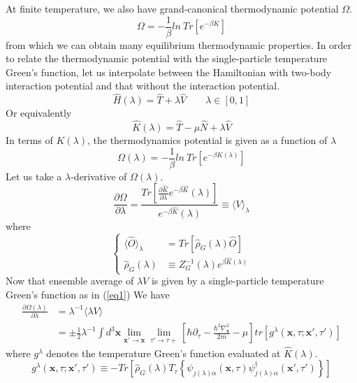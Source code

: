 At finite temperature, we also have grand-canonical thermodynamic potential $\Omega$.
\begin{equation}
\Omega=-\frac{1}{\beta}ln\ Tr\left[e^{-\beta K}\right]
\end{equation}
from which we can obtain many equilibrium thermodynamic properties.
In order to relate the thermodynamic potential with the single-particle temperature Green's function, let us interpolate between the Hamiltonian with two-body interaction potential and that without the interaction potential.
$$\hat{H}(\lambda)=\hat{T}+\lambda \hat{V}\qquad \lambda\in[0,1]$$
Or equivalently
$$\hat{K}(\lambda)=\hat{T}-\mu\hat{N}+\lambda\hat{V}$$
In terms of $K(\lambda)$, the thermodynamics potential is given as a function of $\lambda$
\[
\Omega(\lambda)=-\frac{1}{\beta}ln\ Tr\left[e^{-\beta K(\lambda)}\right] \tag{$4.1.15^\prime$}
\]
Let us take a $\lambda$-derivative of $\Omega(\lambda)$.
\begin{equation}
\frac{\partial\Omega}{\partial\lambda}=\frac{Tr\left[\frac{\partial\hat{K}}{\partial\lambda}e^{-\beta\hat{K}}(\lambda)\right]} {e^{-\beta\hat{K}}(\lambda)} \equiv \langle V\rangle_{\lambda}
\end{equation}
where
$$
\left\{
\begin{aligned}
\langle\hat{O}\rangle_{\lambda} & =Tr\left[\hat{\rho}_{G}(\lambda)\hat{O}\right]\\
\hat{\rho}_{G}(\lambda) & \equiv Z^{-1}_{G}(\lambda)e^{\beta\hat{K}(\lambda)}
\end{aligned}
\right.
$$
Now that ensemble average of $\lambda V$ is given by a single-particle temperature Green's function as in (\ref{eq1})
We have
$$
\begin{aligned}
\frac{\partial\Omega(\lambda)}{\partial\lambda} & =\lambda^{-1}\langle\lambda V\rangle\\
&=\pm\frac{1}{2}\lambda^{-1}\int d^{3}\mathbf{x}\lim_{\mathbf{x'}\rightarrow\mathbf{x}}\lim_{\tau'\rightarrow\tau+}\left[\hbar\partial_{\tau}-\frac{\hbar^{2}\nabla^{2}_{\mathbf{x}}}{2m}-\mu\right] tr[g^{\lambda}(\mathbf{x},\tau;\mathbf{x'},\tau')]
\end{aligned}
$$
where $g^{\lambda}$ denotes the temperature Green's function evaluated at $\hat{K}(\lambda)$.
\begin{equation}
g^{\lambda}(\mathbf{x},\tau;\mathbf{x'},\tau')\equiv-Tr\left[\hat{\rho}_{G}(\lambda)T_{\tau}\left\{\psi_{j(\lambda)\alpha}(\mathbf{x},\tau) \psi^{\dagger}_{j(\lambda)\alpha}(\mathbf{x'},\tau')\right\}\right]
\end{equation}
